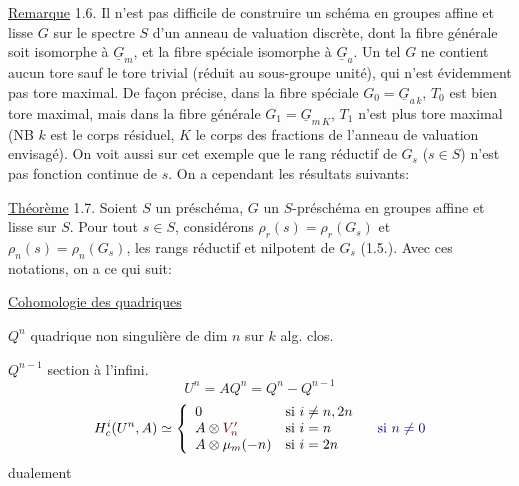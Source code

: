\uline{Remarque} 1.6. Il n'est pas difficile de construire un schéma en groupes affine et lisse $G$ sur le spectre $S$ d'un anneau de valuation discrète, dont la fibre générale soit isomorphe à $\underline G_m$, et la fibre spéciale isomorphe à $\underline G_a$. Un tel $G$ ne contient aucun tore sauf le tore trivial  (réduit au sous-groupe unité), qui n'est évidemment pas tore maximal. De façon précise, dans la fibre spéciale $G_0=\underline G_{a\,k}$, $T_0$ est bien tore maximal, mais dans la fibre générale $G_1=\underline G_{m\,K}$, $T_1$ n'est plus tore maximal (NB $k$ est le corps résiduel, $K$ le corps des fractions de l'anneau de valuation envisagé). On voit aussi sur cet exemple que le rang réductif de $G_s$ ($s\in S$) n'est pas fonction continue de $s$. On a cependant les résultats suivants:

\uline{Théorème} 1.7. Soient $S$ un préschéma, $G$ un $S$-préschéma en groupes affine et lisse sur $S$. Pour tout $s\in S$, considérons $\rho_r(s)=\rho_r(G_s)$ et $\rho_n(s)=\rho_n(G_s)$, les rangs réductif et nilpotent de $G_s$ (1.5.). Avec ces notations, on a ce qui suit:


\uline{Cohomologie des quadriques}

$Q^n$ quadrique non singulière de dim $n$ sur $k$ alg. clos.

$Q^{n-1}$ section à l'infini.
\[
U^n=AQ^n=Q^n-Q^{n-1}
\]
\[
H_c^i(U^n,A)\simeq
\left\{\begin{array}{ll}
0&\text{si }i\neq n,2n\\
A\otimes\unsure{V'_n}&\text{si }i=n\\
A\otimes\mu_m(-n)&\text{si }i=2n
\end{array}\right.
\quad\inserted{\text{si }n\neq0}
\]
\margin{\[
\unsure{V'_n}=\check V_n\otimes\mu_m(-n)=
\begin{cases}
\mu_m(-\frac n2)&n\text{ pair}\\
\mu_m(\unsure{-\frac{n+1}{2}})&n\text{ imp.}
\end{cases}
\]
\[
V'_n=V_n=\mu_m(-\tfrac n2)\quad n\text{ pair}
\]
\[
V'_n=V_n\otimes\mu_m(1)\quad n\text{ impair}
\]}
dualement
\diagram{\[
H^i(U^n,A)\simeq
\left\{\begin{gathered}
\begin{tikzcd}[column sep=small,row sep=small]
0 & \text{si }i\neq0,n\\
A\otimes V_n \arrow[d,bend right=30] & i=0\\
A \arrow[u,bend left=50] & \text{si }i=n.
\end{tikzcd}
\end{gathered}\right.
\]}

